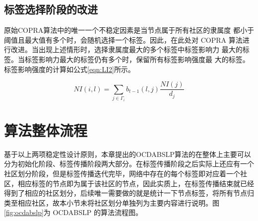 \subsection{标签选择阶段的改进}

原始COPRA算法中的唯一一个不稳定因素是当节点属于所有社区的隶属度
都小于阈值且最大值有多个时，会随机选择一个标签。因此，在此处对 COPRA
算法进行改进。当出现上述情形时，选择隶属度最大的多个标签中标签影响力
最大的标签。当标签影响力最大的标签仍有多个时，保留所有标签影响强度最
大的标签。标签影响强度的计算如公式\ref{eqn:LI2}所示。

\begin{equation}
  \label{eqn:LI2}
  NI(i,l)=\sum_{j \in \Gamma _i} b_{t-1}(l,j) \frac{NI(j)}{d_j}
\end{equation}

\section{算法整体流程}

基于以上两项稳定性设计原则，本章提出的OCDABSLP算法的在整体上主要可以分为初始化阶段、标签传播阶段两大部分。在标签传播阶段之后实际上还应有一个社区划分阶段，但是标签传播迭代完毕，网络中存在的每个标签即对应着一个社区，相应标签的节点即为属于该社区的节点，因此实质上，在标签传播结束就已经得到了相应的社区划分，后续唯一需要做的就是统计一下节点标签，将所有节点归类至相应社区，故本小节未将社区划分单独列为主要内容进行说明。图\ref{fig:ocdabslp}为 OCDABSLP 的算法流程图。


